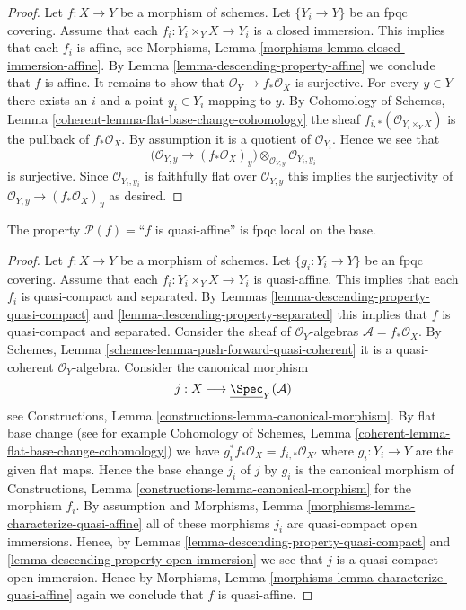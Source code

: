\begin{proof}
Let $f : X \to Y$ be a morphism of schemes.
Let $\{Y_i \to Y\}$ be an fpqc covering.
Assume that each $f_i : Y_i \times_Y X \to Y_i$
is a closed immersion.
This implies that each $f_i$ is affine, see
Morphisms, Lemma \ref{morphisms-lemma-closed-immersion-affine}.
By Lemma \ref{lemma-descending-property-affine}
we conclude that $f$ is affine. It remains to show that
$\mathcal{O}_Y \to f_*\mathcal{O}_X$ is surjective.
For every $y \in Y$ there exists an $i$ and a point
$y_i \in Y_i$ mapping to $y$.
By Cohomology of Schemes, Lemma \ref{coherent-lemma-flat-base-change-cohomology}
the sheaf $f_{i, *}(\mathcal{O}_{Y_i \times_Y X})$
is the pullback of $f_*\mathcal{O}_X$.
By assumption it is a quotient of $\mathcal{O}_{Y_i}$.
Hence we see that
$$
\Big(
\mathcal{O}_{Y, y} \longrightarrow (f_*\mathcal{O}_X)_y
\Big)
\otimes_{\mathcal{O}_{Y, y}} \mathcal{O}_{Y_i, y_i}
$$
is surjective. Since $\mathcal{O}_{Y_i, y_i}$ is faithfully
flat over $\mathcal{O}_{Y, y}$ this implies the surjectivity
of $\mathcal{O}_{Y, y} \longrightarrow (f_*\mathcal{O}_X)_y$ as
desired.
\end{proof}

\begin{lemma}
\label{lemma-descending-property-quasi-affine}
The property $\mathcal{P}(f) =$``$f$ is quasi-affine''
is fpqc local on the base.
\end{lemma}

\begin{proof}
Let $f : X \to Y$ be a morphism of schemes.
Let $\{g_i : Y_i \to Y\}$ be an fpqc covering.
Assume that each $f_i : Y_i \times_Y X \to Y_i$
is quasi-affine.
This implies that each $f_i$ is quasi-compact and separated.
By Lemmas \ref{lemma-descending-property-quasi-compact}
and \ref{lemma-descending-property-separated}
this implies that $f$ is quasi-compact and separated.
Consider the sheaf of $\mathcal{O}_Y$-algebras
$\mathcal{A} = f_*\mathcal{O}_X$.
By Schemes, Lemma \ref{schemes-lemma-push-forward-quasi-coherent}
it is a quasi-coherent $\mathcal{O}_Y$-algebra.
Consider the canonical morphism
$$
j : X \longrightarrow \underline{\Spec}_Y(\mathcal{A})
$$
see Constructions, Lemma \ref{constructions-lemma-canonical-morphism}.
By flat base change
(see for example
Cohomology of Schemes, Lemma \ref{coherent-lemma-flat-base-change-cohomology})
we have $g_i^*f_*\mathcal{O}_X = f_{i, *}\mathcal{O}_{X'}$
where $g_i : Y_i \to Y$ are the given flat
maps. Hence the base change $j_i$ of $j$ by $g_i$ is the canonical
morphism of Constructions, Lemma \ref{constructions-lemma-canonical-morphism}
for the morphism $f_i$. By assumption and
Morphisms, Lemma \ref{morphisms-lemma-characterize-quasi-affine}
all of these
morphisms $j_i$ are quasi-compact open immersions. Hence, by
Lemmas \ref{lemma-descending-property-quasi-compact} and
\ref{lemma-descending-property-open-immersion} we
see that $j$ is a quasi-compact open immersion.
Hence by
Morphisms, Lemma \ref{morphisms-lemma-characterize-quasi-affine}
again we conclude that $f$ is quasi-affine.
\end{proof}

